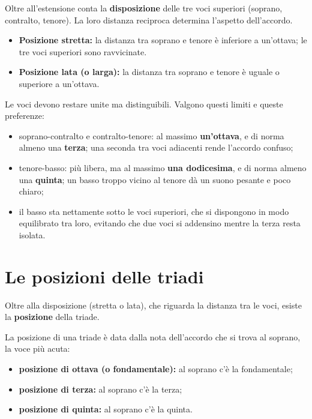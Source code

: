 Oltre all'estensione conta la \textbf{disposizione} delle tre voci superiori (soprano, contralto, tenore). La loro distanza reciproca determina l'aspetto dell'accordo.

\begin{definizione}
	\label{def:posizione_stretta_lata}
	\begin{itemize}
		\item \textbf{Posizione stretta:} la distanza tra soprano e tenore è inferiore a un'ottava; le tre voci superiori sono ravvicinate.
		\item \textbf{Posizione lata (o larga):} la distanza tra soprano e tenore è uguale o superiore a un'ottava.
	\end{itemize}
\end{definizione}

\begin{regola}
	\label{reg:distanza_voci}
	Le voci devono restare unite ma distinguibili. Valgono questi limiti e queste preferenze:
	\begin{itemize}
		\item soprano-contralto e contralto-tenore: al massimo \textbf{un'ottava}, e di norma almeno una \textbf{terza}; una seconda tra voci adiacenti rende l'accordo confuso;
		\item tenore-basso: più libera, ma al massimo \textbf{una dodicesima}, e di norma almeno una \textbf{quinta}; un basso troppo vicino al tenore dà un suono pesante e poco chiaro;
		\item il basso sta nettamente sotto le voci superiori, che si dispongono in modo equilibrato tra loro, evitando che due voci si addensino mentre la terza resta isolata.
	\end{itemize}
\end{regola}

\section{Le posizioni delle triadi}
\label{sec:posizioni_triadi}

Oltre alla disposizione (stretta o lata), che riguarda la distanza tra le voci, esiste la \textbf{posizione} della triade.

\begin{definizione}
	\label{def:posizione_triade}
	La posizione di una triade è data dalla nota dell'accordo che si trova al soprano, la voce più acuta:
	\begin{itemize}
		\item \textbf{posizione di ottava (o fondamentale):} al soprano c'è la fondamentale;
		\item \textbf{posizione di terza:} al soprano c'è la terza;
		\item \textbf{posizione di quinta:} al soprano c'è la quinta.
	\end{itemize}
\end{definizione}

